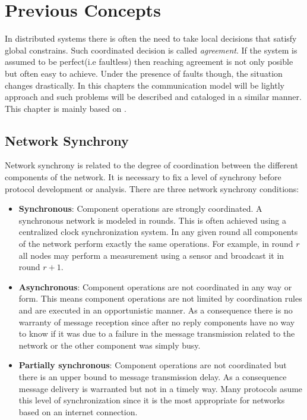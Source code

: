 \documentclass[..]{subfiles}
\begin{document}
\chapter{Previous Concepts}\label{chap:previous}

In distributed systems there is often the need to take local decisions that satisfy global constrains. Such coordinated decision is called \textit{agreement}. If the system is assumed to be perfect(i.e faultless) then reaching agreement is not only posible but often easy to achieve. Under the presence of faults though, the situation changes drastically. In this chapters the communication model will be lightly approach and such problems will be described and cataloged in a similar manner. This chapter is mainly based on \cite{santoro2006design}.


\section{Network Synchrony}

Network synchrony is related to the degree of coordination between the different components of the network. It is necessary to fix a level of synchrony before protocol development or analysis. There are three network synchrony conditions:

\begin{itemize}
	\item \textbf{Synchronous}: Component operations are strongly coordinated. A synchronous network is modeled in rounds. This is often achieved using a centralized clock synchronization system. In any given round all components of the network perform exactly the same operations. For example, in round $r$ all nodes may perform a measurement using a sensor and broadcast it in round $r+1$.
	\item \textbf{Asynchronous}: Component operations are not coordinated in any way or form. This means component operations are not limited by coordination rules and are executed in an opportunistic manner. As a consequence there is no warranty of message reception since after no reply components have no way to know if it was due to a failure in the message transmission related to the network or the other component was simply busy.
	\item \textbf{Partially synchronous}: Component operations are not coordinated but there is an upper bound to message transmission delay. As a consequence message delivery is warranted but not in a timely way. Many protocols asume this level of synchronization since it is the most appropriate for networks based on an internet connection.
\end{itemize}
\end{document}
